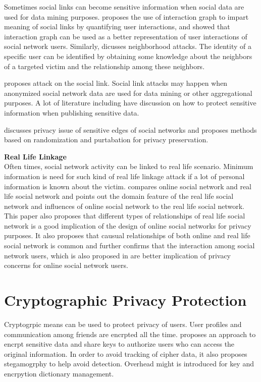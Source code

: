 \documentclass[12pt]{article}
\begin{document}
Sometimes social links can become sensitive information when social
data are used for data mining
purposes. \cite{user-interaction-social-link} proposes the use of
interaction graph to impart meaning of social links by quantifying
user interactions, and showed that interaction graph can be used as a
better representation of user interactions of social network users.
Similarly, \cite{neighborhood-attack} dicusses neighborhood
attacks. The identity of a specific user can be identified by
obtaining some knowledge about the neighbors of a targeted victim and
the relationship among these neighbors.

\cite{anony-link-attack} proposes attack on the social link. Social
link attacks may happen when anonymized social network data are used
for data mining or other aggregational purposes. A lot of literature
including \cite{privacy-preserve-publishing-survey} have discussion on
how to protect sensitive information when publishing sensitive data.

\cite{privacy-sensitive-edge} discusses privacy issue of sensitive
edges of social networks and proposes methods based on randomization
and purtabation for privacy preservation. 

\textbf{Real Life Linkage} \\
Often times, social network activity can be linked to real life
scenario. Minimum information is need for such kind of real life
linkage attack if a lot of personal information is known about the
victim. \cite{real-life-social-network} compares online social network
and real life social network and points out the domain feature of the
real life social network and influences of online social network to
the real life social network. This paper also proposes that different
types of relationships of real life social network is a good
implication of the design of online social networks for privacy
purposes. It also proposes that causual relationships of both online
and real life social network is common and further confirms that the
interaction among social network users, which is also proposed in
\cite{user-interaction-social-link} are better implication of privacy
concerns for online social network users. 

\section{Cryptographic Privacy Protection \label{sec:crypto}}
Cryptogrpic means can be used to protect privacy of users. User
profiles and communication among friends are encrpted all the
time. \cite{noyb} proposes an approach to encrpt sensitive data and
share keys to authorize users who can access the original
information. In order to avoid tracking of cipher data, it also
proposes stegamogrphy to help avoid detection. Overhead might is
introduced for key and encrpytion dictionary management. 
\end{document}
